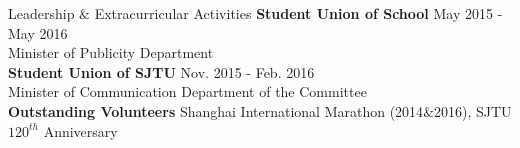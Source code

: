 \documentclass{resume} %
\begin{document}
\begin{rSection}{Leadership $\&$ Extracurricular Activities}
\textbf{Student Union of School} \hfill{May 2015 - May 2016}\\
Minister of Publicity Department  \\
\textbf{Student Union of SJTU} \hfill{Nov. 2015 - Feb. 2016}\\
Minister of Communication Department of the Committee \\
\textbf{Outstanding Volunteers} \hfill{Shanghai International Marathon (2014$\&$2016), SJTU $120^{th}$ Anniversary}
\end{rSection}
\clearpage
\end{document}
